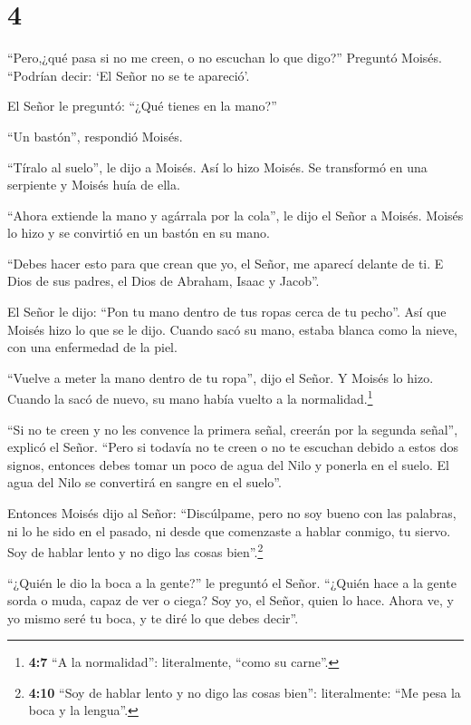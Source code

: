 \hypertarget{section-3}{%
\section{4}\label{section-3}}

 ``Pero,¿qué pasa si no me creen, o no escuchan lo que
digo?'' Preguntó Moisés. ``Podrían decir: `El Señor no se te apareció'.

 El Señor le preguntó: ``¿Qué tienes en la mano?''

``Un bastón'', respondió Moisés.

 ``Tíralo al suelo'', le dijo a Moisés. Así lo hizo Moisés.
Se transformó en una serpiente y Moisés huía de ella.

 ``Ahora extiende la mano y agárrala por la cola'', le dijo
el Señor a Moisés. Moisés lo hizo y se convirtió en un bastón en su
mano.

 ``Debes hacer esto para que crean que yo, el Señor, me
aparecí delante de ti. E Dios de sus padres, el Dios de Abraham, Isaac y
Jacob''.

 El Señor le dijo: ``Pon tu mano dentro de tus ropas cerca
de tu pecho''. Así que Moisés hizo lo que se le dijo. Cuando sacó su
mano, estaba blanca como la nieve, con una enfermedad de la piel.

 ``Vuelve a meter la mano dentro de tu ropa'', dijo el
Señor. Y Moisés lo hizo. Cuando la sacó de nuevo, su mano había vuelto a
la normalidad.\footnote{\textbf{4:7} ``A la normalidad'': literalmente,
  ``como su carne''.}

 ``Si no te creen y no les convence la primera señal,
creerán por la segunda señal'', explicó el Señor.  ``Pero si
todavía no te creen o no te escuchan debido a estos dos signos, entonces
debes tomar un poco de agua del Nilo y ponerla en el suelo. El agua del
Nilo se convertirá en sangre en el suelo''.

 Entonces Moisés dijo al Señor: ``Discúlpame, pero no soy
bueno con las palabras, ni lo he sido en el pasado, ni desde que
comenzaste a hablar conmigo, tu siervo. Soy de hablar lento y no digo
las cosas bien''.\footnote{\textbf{4:10} ``Soy de hablar lento y no digo
  las cosas bien'': literalmente: ``Me pesa la boca y la lengua''.}

 ``¿Quién le dio la boca a la gente?'' le preguntó el
Señor. ``¿Quién hace a la gente sorda o muda, capaz de ver o ciega? Soy
yo, el Señor, quien lo hace.  Ahora ve, y yo mismo seré tu
boca, y te diré lo que debes decir''.

